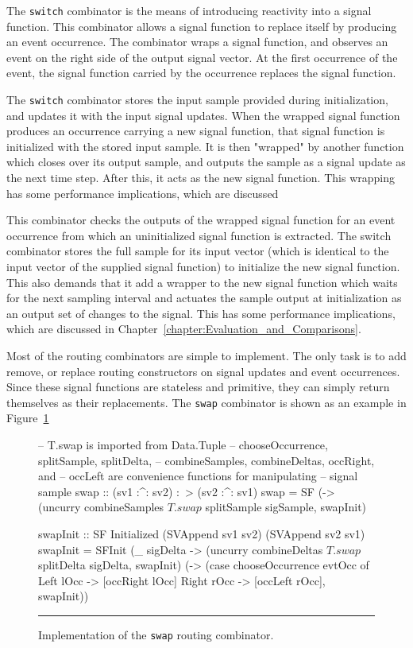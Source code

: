 The {\tt switch} combinator is the means of introducing reactivity into a signal
function. This combinator allows a signal function to replace itself by
producing an event occurrence. The combinator wraps a signal function, and 
observes an event on the right side of the output signal vector. At the first
occurrence of the event, the signal function carried by the occurrence replaces
the signal function. 

The {\tt switch} combinator stores the input sample provided during initialization,
and updates it with the input signal updates. When the wrapped signal function
produces an occurrence carrying a new signal function, that signal function is
initialized with the stored input sample. It is then "wrapped" by another
function which closes over its output sample, and outputs the sample as a signal
update as the next time step. After this, it acts as the new signal function.
This wrapping has some performance implications, which are discussed 

This combinator checks the outputs of the wrapped
signal function for an event occurrence from which an uninitialized signal
function is extracted. The switch combinator stores the full sample
for its input vector (which is identical to the input vector of the supplied
signal function) to initialize the new signal function. This also demands that
it add a wrapper to the new signal function which waits for the next sampling
interval and actuates the sample output at initialization as an output set
of changes to the signal. This has some performance implications, which are
discussed in Chapter~\ref{chapter:Evaluation_and_Comparisons}.

Most of the routing combinators are simple to implement. The only task is to add
remove, or replace routing constructors on signal updates and event occurrences.
Since these signal functions are stateless and primitive, they can simply
return themselves as their replacements. The {\tt swap} combinator is shown as
an example in Figure~\ref{figure:swap_implementation}

\begin{figure}
\begin{code}
-- T.swap is imported from Data.Tuple
-- chooseOccurrence, splitSample, splitDelta,
--  combineSamples, combineDeltas, occRight, and
--  occLeft are convenience functions for manipulating
--  signal sample
swap :: (sv1 :^: sv2) :~> (sv2 :^: sv1)
swap =
  SF (\sigSample ->  
       (uncurry combineSamples $ T.swap $ splitSample sigSample, 
        swapInit)

swapInit :: SF Initialized (SVAppend sv1 sv2) (SVAppend sv2 sv1)
swapInit =
  SFInit (\_ sigDelta ->
           (uncurry combineDeltas $ T.swap $ splitDelta sigDelta,
            swapInit) 
         (\evtOcc ->
            (case chooseOccurrence evtOcc of
               Left lOcc  -> [occRight lOcc]
               Right rOcc -> [occLeft rOcc], swapInit))

\end{code}
\hrule
\caption{Implementation of the {\tt swap} routing combinator.}
\label{figure:swap_implementation}
\end{figure}

